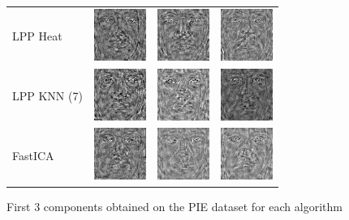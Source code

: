 \documentclass[10pt, a4paper]{article}
\begin{document}
\begin{figure}[h!]
\begin{tabular}{lccc}
LPP Heat & \includegraphics{pie/pie_lpp_heat1} & \includegraphics{pie/pie_lpp_heat2} & \includegraphics{pie/pie_lpp_heat3} \\
LPP KNN (7) & \includegraphics{pie/pie_lpp_knn1} & \includegraphics{pie/pie_lpp_knn2} & \includegraphics{pie/pie_lpp_knn3} \\
FastICA & \includegraphics{pie/pie_ica1} & \includegraphics{pie/pie_ica2} & \includegraphics{pie/pie_ica3} \\
\end{tabular}
\caption{First 3 components obtained on the PIE dataset for each algorithm}
\label{comppie}
\end{figure}
\end{document}
